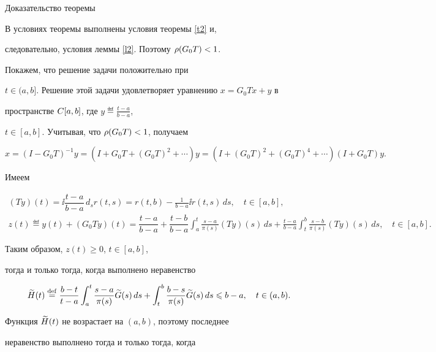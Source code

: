 \begin{pf*}{Доказательство теоремы \protect{\ref{t3}}}


В условиях теоремы выполнены условия теоремы \ref{t2} и,


следовательно, условия леммы \ref{l2}. Поэтому $\rho(G_0T)<1$.


Покажем, что решение задачи  положительно при


$t\in(a,b]$.  Решение этой задачи удовлетворяет уравнению $x=G_0Tx+y$ в


пространстве $C[a,b]$, где $y\eqdef\frac{t-a}{b-a}$,


$t\in[a,b]$. Учитывая, что $\rho(G_0T)<1$, получаем


$$


x=(I-G_0T)^{-1}y=(I+G_0T+(G_0T)^2+\dotsb)y=


(I+(G_0T)^2+(G_0T)^4+\dotsb)(I+G_0T)y.


$$





Имеем


\begin{gather*}


(Ty)(t)=\ii\dfrac{t-a}{b-a}\,d_sr(t,s)=r(t,b)-\frac{1}{b-a}\ii


r(t,s)\,ds,\quad t\in[a,b],\\


z(t)\eqdef y(t)+(G_0Ty)(t)=\dfrac{t-a}{b-a}+


\dfrac{t-b}{b-a}\int_a^t\frac{s-a}{\pi(s)}(Ty)(s)\,ds+


\frac{t-a}{b-a}\int_t^b\frac{s-b}{\pi(s)}(Ty)(s)\,ds,\quad


t\in[a,b].


\end{gather*}





Таким образом, $z(t)\ge0$, $t\in[a,b]$,


тогда и только тогда, когда выполнено неравенство


$$\w H(t)\eqdef\frac{b-t}{t-a}\int_a^t\frac{s-a}{\pi(s)}\w G(s)\,ds+


\int_t^b\frac{b-s}{\pi(s)}\w G(s)\,ds


\le b-a,\quad t\in(a,b).


$$


Функция $\widetilde H(t)$ не возрастает на $(a,b)$, поэтому последнее


неравенство выполнено тогда и только тогда, когда



\end{pf*}
